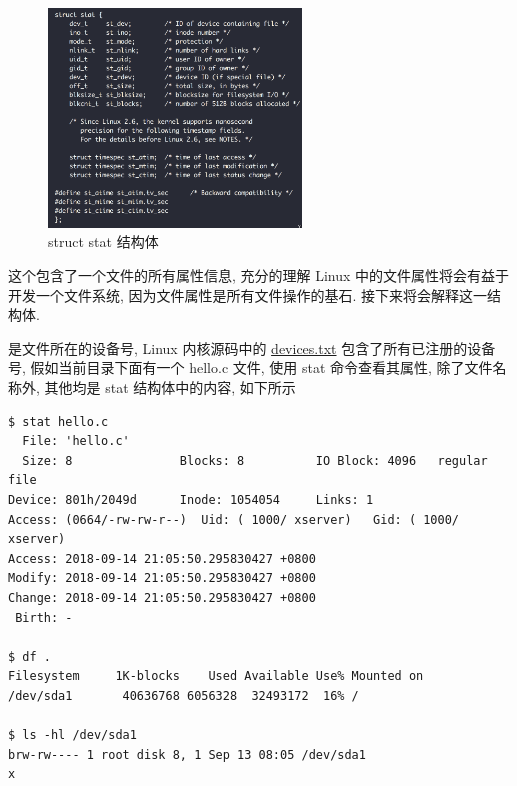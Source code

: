 \begin{figure}[H]
    \centerline{\includegraphics[width=0.6\textwidth]{./Figures/struct-stat.png}}
    \caption{struct stat 结构体}
    \label{fig:stat}
\end{figure}

这个包含了一个文件的所有属性信息, 充分的理解 Linux 中的文件属性将会有益于开发一个文件系统,
因为文件属性是所有文件操作的基石. 接下来将会解释这一结构体.

 是文件所在的设备号, Linux 内核源码中的
\href{https://github.com/torvalds/linux/blob/master/Documentation/admin-guide/devices.txt}{devices.txt}
包含了所有已注册的设备号, 假如当前目录下面有一个 hello.c 文件, 使用 stat 命令查看其属性,
除了文件名称外, 其他均是 stat 结构体中的内容, 如下所示

\begin{lstlisting}[style=verb]
$ stat hello.c
  File: 'hello.c'
  Size: 8               Blocks: 8          IO Block: 4096   regular file
Device: 801h/2049d      Inode: 1054054     Links: 1
Access: (0664/-rw-rw-r--)  Uid: ( 1000/ xserver)   Gid: ( 1000/ xserver)
Access: 2018-09-14 21:05:50.295830427 +0800
Modify: 2018-09-14 21:05:50.295830427 +0800
Change: 2018-09-14 21:05:50.295830427 +0800
 Birth: -

$ df .
Filesystem     1K-blocks    Used Available Use% Mounted on
/dev/sda1       40636768 6056328  32493172  16% /

$ ls -hl /dev/sda1
brw-rw---- 1 root disk 8, 1 Sep 13 08:05 /dev/sda1
x
\end{lstlisting}


